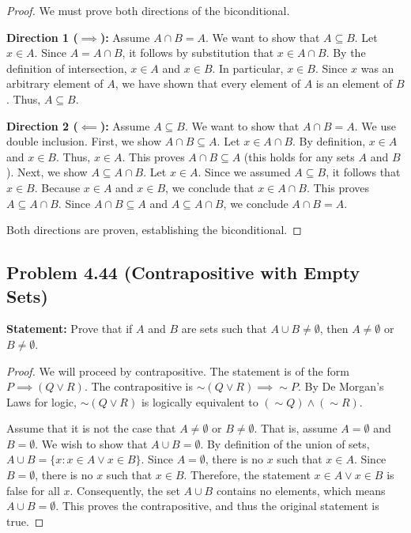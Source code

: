\documentclass[11pt]{article}
\theoremstyle{definition}
\theoremstyle{remark}
\begin{document}
\begin{proof}
We must prove both directions of the biconditional.

\textbf{Direction 1 ($\implies$):} Assume $A \cap B = A$. We want to show that $A \subseteq B$. 
Let $x \in A$. Since $A = A \cap B$, it follows by substitution that $x \in A \cap B$. By the definition of intersection, $x \in A$ and $x \in B$. In particular, $x \in B$. Since $x$ was an arbitrary element of $A$, we have shown that every element of $A$ is an element of $B$. Thus, $A \subseteq B$.

\textbf{Direction 2 ($\impliedby$):} Assume $A \subseteq B$. We want to show that $A \cap B = A$. We use double inclusion.
First, we show $A \cap B \subseteq A$. Let $x \in A \cap B$. By definition, $x \in A$ and $x \in B$. Thus, $x \in A$. This proves $A \cap B \subseteq A$ (this holds for any sets $A$ and $B$).
Next, we show $A \subseteq A \cap B$. Let $x \in A$. Since we assumed $A \subseteq B$, it follows that $x \in B$. Because $x \in A$ and $x \in B$, we conclude that $x \in A \cap B$. This proves $A \subseteq A \cap B$.
Since $A \cap B \subseteq A$ and $A \subseteq A \cap B$, we conclude $A \cap B = A$.

Both directions are proven, establishing the biconditional.
\end{proof}

\subsection{Problem 4.44 (Contrapositive with Empty Sets)}
\textbf{Statement:} Prove that if $A$ and $B$ are sets such that $A \cup B \neq \emptyset$, then $A \neq \emptyset$ or $B \neq \emptyset$.

\begin{proof}
We will proceed by contrapositive. The statement is of the form $P \implies (Q \lor R)$. The contrapositive is $\sim(Q \lor R) \implies \sim P$. By De Morgan's Laws for logic, $\sim(Q \lor R)$ is logically equivalent to $(\sim Q) \land (\sim R)$. 

Assume that it is not the case that $A \neq \emptyset$ or $B \neq \emptyset$. That is, assume $A = \emptyset$ and $B = \emptyset$. 
We wish to show that $A \cup B = \emptyset$.
By definition of the union of sets, $A \cup B = \{x : x \in A \lor x \in B\}$. 
Since $A = \emptyset$, there is no $x$ such that $x \in A$. Since $B = \emptyset$, there is no $x$ such that $x \in B$. 
Therefore, the statement $x \in A \lor x \in B$ is false for all $x$. 
Consequently, the set $A \cup B$ contains no elements, which means $A \cup B = \emptyset$. 
This proves the contrapositive, and thus the original statement is true.
\end{proof}
\end{document}
